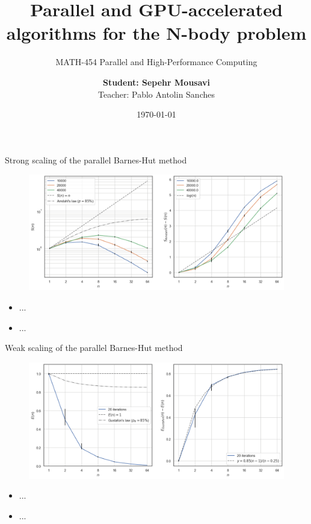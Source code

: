 \documentclass[8pt]{beamer}
\author{
    \textbf{Student: Sepehr Mousavi} \\
    Teacher: Pablo Antolin Sanches
}
\title[Parallelization of the N-Body problem]{Parallel and GPU-accelerated algorithms for the N-body problem}
\subtitle[P-HPC]{MATH-454 Parallel and High-Performance Computing}
\institute[EPFL]{{École Polytechnique Fédérale de Lausanne}}
\date{\today}
\begin{document}
\frame{\titlepage}

\begin{frame}{Strong scaling of the parallel Barnes-Hut method}

    \begin{figure}
        \centering
        \includegraphics[width=.8\textwidth]{img/strongscaling.png}
    \end{figure}

  \begin{itemize}
    \item ...
    \item ...
  \end{itemize}

\end{frame}

\begin{frame}{Weak scaling of the parallel Barnes-Hut method}

    \begin{figure}
        \centering
        \includegraphics[width=.8\textwidth]{img/weakscaling.png}
    \end{figure}

    \begin{itemize}
    \item ...
    \item ...
    \end{itemize}

\end{frame}
\end{document}
